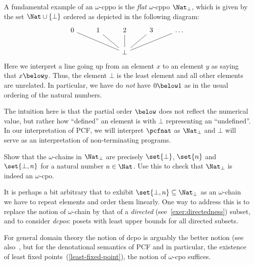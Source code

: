 \begin{example}[\(\Nat_\bot\)]\label{exam:N_bot}
  A fundamental example of an \(\omega\)-cppo is the \emph{flat} \(\omega\)-cppo
  \(\Nat_\bot\), which is given by the set \(\Nat \cup \{\bot\}\) ordered as
  depicted in the following diagram:
  \[
    \begin{tikzcd}
      0 & 1 & 2 & 3 & \ldots \\
      & & \bot \ar[ull,no head] \ar[ul,no head] \ar[u,no head] \ar[ur, no head]
      \ar[urr, no head]
    \end{tikzcd}
  \]
  Here we interpret a line going up from an element \(x\) to an element \(y\) as
  saying that \(x \below y\).
  Thus, the element \(\bot\) is the least element and all other elements are
  unrelated.
  In particular, we have do \emph{not} have \(0 \below 1\) as in the usual
  ordering of the natural numbers.

  The intuition here is that the partial order \({\below}\) does not reflect the
  numerical value, but rather how ``defined'' an element is with \(\bot\)
  representing an ``undefined''.
  In our interpretation of PCF, we will interpret \(\pcfnat\) as \(\Nat_\bot\)
  and \(\bot\) will serve as an interpretation of non-terminating programs.
\end{example}

\begin{exercise}\label{exer:N_bot}
  Show that the \(\omega\)-chains in \(\Nat_\bot\) are precisely \(\set{\bot}\),
  \(\set{n}\) and \(\set{\bot,n}\) for a natural number \(n \in \Nat\).
  Use this to check that \(\Nat_\bot\) is indeed an \(\omega\)-cpo.
\end{exercise}

\begin{remark}
  It is perhaps a bit arbitrary that to exhibit
  \(\set{\bot,n} \subseteq \Nat_\bot\) as an \(\omega\)-chain we have to repeat
  elements and order them linearly.
  One way to address this is to replace the notion of \(\omega\)-chain by that
  of a \emph{directed} (see~\cref{exer:directedness}) subset, and to consider
  \emph{dcpos}: posets with least upper bounds for all directed subsets.

  For general domain theory the notion of dcpo is arguably the better notion
  (see also~\cite[Section~2.2.4]{AbramskyJung1994}, but for the denotational
  semantics of PCF and in particular, the existence of least fixed
  points~(\cref{least-fixed-point}), the notion of \(\omega\)-cpo suffices.
\end{remark}

